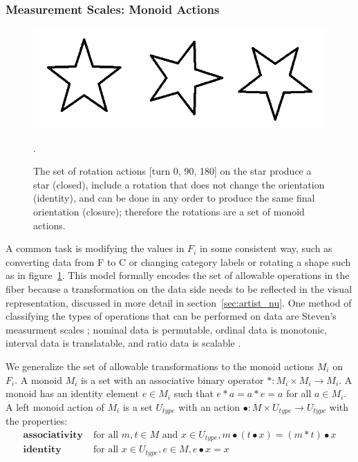 \documentclass[../main.tex]{subfiles}
\begin{document}
\subsubsection{Measurement Scales: Monoid Actions}
\label{sec:data_monoid}

\begin{figure}[ht!]
    \includegraphics[width=\textwidth]{figures/math/rotation_actions.png}
    \label{fig:data_monoid_rotation}
    \caption{The set of rotation actions [turn 0, 90, 180] on the star produce a star (closed), include a rotation that does not change the orientation (identity), and can be done in any order to produce the same final orientation (closure); therefore the rotations are a set of monoid actions.}.  
\end{figure}

A common task is modifying the values in $F_i$ in some consistent way, such as converting data from \textdegree F to \textdegree C or changing category labels or rotating a shape such as in figure~\ref{fig:data_monoid_rotation}. This model formally encodes the set of allowable operations in the fiber because a transformation on the data side needs to be reflected in the visual representation, discussed in more detail in section~\ref{sec:artist_nu}. One method of classifying the types of operations that can be performed on data are Steven's measurment scales \cite{stevensTheoryScalesMeasurement1946,leaFormalizationMeasurementScale}; nominal data is permutable, ordinal data is monotonic, interval data is translatable, and ratio data is scalable \cite{weissteinSimilarityTransformation}.

We generalize the set of allowable transformations to the monoid actions $M_i$ on $F_i$. A monoid \cite{Monoid2021} $M_i$ is a set with an associative binary operator $\ast:M_i \times M_i\rightarrow M_i$. A monoid has an identity element $e\in M_i$ such that $e\ast a= a \ast e = a$ for all $a \in M_i$. A left monoid action \cite{SemigroupAction2021,ActionNLab} of $M_i$ is a set $U_{type}$ with an action $\bullet: M\times U_{type} \rightarrow U_{type}$ with the properties:
\begin{align*}
    \textbf{associativity}\;& \text{for all } m,t \in M \text{ and } x\in U_{type}, m\bullet(t\bullet x) = (m\ast t) \bullet x\\
    \textbf{identity}\;& \text{for all } x\in U_{type}, e\in M,  e\bullet x = x 
\end{align*}
\end{document}
